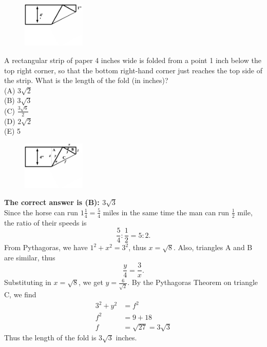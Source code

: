 \documentclass{article}
\begin{document}
\normalsize
\begin{figure}
	\includegraphics[width=30mm,viewport=29 220 524 411]{CCSPR74-20pic.eps}
\end{figure}
A rectangular strip of paper 4 inches wide is folded from a point 1 inch below the top right corner, so that the bottom right-hand corner just reaches the top side of the strip. What is the length of the fold (in inches)?\\
(A) $3\sqrt{2}$\\
(B) $3\sqrt{3}$\\
(C) $\frac{3\sqrt{6}}{2}$\\
(D) $2\sqrt{2}$\\
(E) 5\\

\begin{figure}
	\includegraphics[width=30mm,viewport=29 220 500 431]{CCSPR74-20pic2.eps}
\end{figure}

\textbf{The correct answer is (B): $3\sqrt{3}$}\\[1 ex]
Since the horse can run $1\frac{1}{4}=\frac{5}{4}$ miles in the same time the man can run $\frac{1}{2}$ mile, the ratio of their speeds is
\begin{equation*}
\frac{5}{4}:\frac{1}{2}=5:2.
\end{equation*}
From Pythagoras, we have $1^2+x^2=3^2$, thus $x=\sqrt{8}$. Also, triangles A and B are similar, thus
\begin{equation*}
\frac{y}{4}=\frac{3}{x}.
\end{equation*}
Substituting in $x=\sqrt{8}$, we get $y=\frac{6}{\sqrt{2}}$. By the Pythagoras Theorem on triangle C, we find
\begin{align*}
3^2+y^2&=f^2\\
f^2&=9+18\\
f&=\sqrt{27}=3\sqrt{3}
\end{align*}
Thus the length of the fold is $3\sqrt{3}$ inches.
\end{document}
